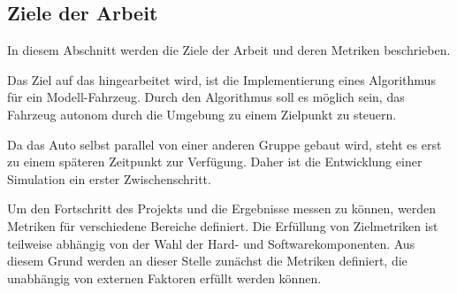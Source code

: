 \subsection{Ziele der Arbeit}
In diesem Abschnitt werden die Ziele der Arbeit und deren Metriken beschrie\-ben.

Das Ziel auf das hingearbeitet wird, ist die Implementierung eines Algorithmus für ein Modell-Fahrzeug. 
Durch den Algorithmus soll es möglich sein, das Fahrzeug autonom durch die Umgebung zu einem Zielpunkt zu steuern.

Da das Auto selbst parallel von einer anderen Gruppe gebaut wird, steht es erst zu einem späteren Zeitpunkt zur Verfügung. 
Daher ist die Entwicklung einer Simulation ein erster Zwischenschritt. 

Um den Fortschritt des Projekts und die Ergebnisse messen zu können, werden Metriken für verschiedene Bereiche definiert.
Die Erfüllung von Zielmetriken ist teilweise abhängig von der Wahl der Hard- und Softwarekomponenten.
Aus diesem Grund werden an dieser Stelle zunächst die Metriken definiert, die unabhängig von externen Faktoren erfüllt werden können. 

